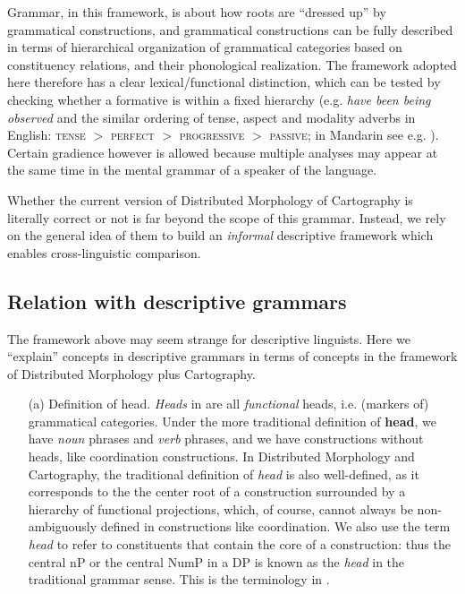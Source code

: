 \documentclass[UTF8, a4paper, oneside, scheme=plain, 12pt]{ctexrep}
\newcommand*{\textgt}{$>$ }
\newcommand*{\concept}[1]{\textbf{#1}}
\newcommand*{\term}[1]{\emph{#1}}
\newcommand{\form}[1]{\emph{#1}}
\newcommand*{\category}[1]{\textsc{#1}}
\begin{document}
{Grammar, in this framework, is about how roots are ``dressed up'' by grammatical constructions,
and grammatical constructions can be fully described
in terms of hierarchical organization of grammatical categories based on constituency relations, and their phonological realization.
The framework adopted here therefore has a clear lexical/functional distinction,
which can be tested by checking whether a formative is within a fixed hierarchy 
(e.g. \form{have been being observed} and the similar ordering of tense, aspect and modality adverbs in English: \category{tense} \textgt{}\category{perfect} \textgt{}\category{progressive} \textgt{}\category{passive}; 
in Mandarin see e.g. ).
Certain gradience however is allowed because multiple analyses may appear at the same time
in the mental grammar of a speaker of the language.

Whether the current version of Distributed Morphology of Cartography is literally correct or not 
is far beyond the scope of this grammar.
Instead, we rely on the general idea of them to build an \emph{informal} descriptive framework
which enables cross-linguistic comparison.

\subsection{Relation with descriptive grammars}\label{sec:theory.descriptive}

The framework above may seem strange for descriptive linguists.
Here we ``explain'' concepts in descriptive grammars in terms of concepts in the framework
of Distributed Morphology plus Cartography.

\begin{itemize}
    \item[(a)] Definition of head. \term{Heads} in  are all \emph{functional} heads,
    i.e. (markers of) grammatical categories.
    Under the more traditional definition of \concept{head},
    we have \emph{noun} phrases and \emph{verb} phrases,
    and we have constructions without heads, like coordination constructions.
    In Distributed Morphology and Cartography, the traditional definition of \term{head} is also well-defined,
    as it corresponds to the the center root of a construction surrounded by a hierarchy of functional projections,
    which, of course, cannot always be non-ambiguously defined in constructions like coordination.
    We also use the term \term{head} to refer to constituents that contain the core of a construction:
    thus the central nP or the central NumP in a DP is known as the \term{head} in the traditional grammar sense.
    This is the terminology in \citet{cgel}.


\end{itemize}}
\end{document}

